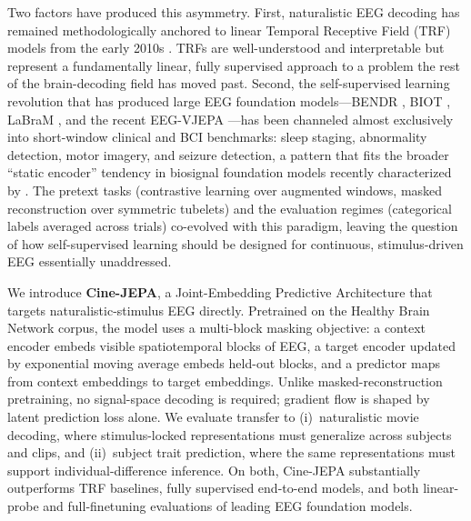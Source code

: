 Two factors have produced this asymmetry. First, naturalistic EEG decoding has
remained methodologically anchored to linear Temporal Receptive Field (TRF)
models from the early 2010s \citep{lalor2010, crosse2016, diliberto2018}. TRFs
are well-understood and interpretable but represent a fundamentally linear,
fully supervised approach to a problem the rest of the brain-decoding field has
moved past. Second, the self-supervised learning revolution that has produced
large EEG foundation models---BENDR \citep{kostas2021}, BIOT \citep{yang2023},
LaBraM \citep{jiang2024}, and the recent EEG-VJEPA \citep{hojjati2025}---has
been channeled almost exclusively into short-window clinical and BCI benchmarks:
sleep staging, abnormality detection, motor imagery, and seizure detection,
a pattern that fits the broader ``static encoder'' tendency in biosignal
foundation models recently characterized by \citet{wu2026}. The pretext tasks
(contrastive learning over augmented windows, masked reconstruction over
symmetric tubelets) and the evaluation regimes (categorical labels averaged
across trials) co-evolved with this paradigm, leaving the question of how
self-supervised learning should be designed for continuous, stimulus-driven
EEG essentially unaddressed.
 
We introduce \textbf{Cine-JEPA}, a Joint-Embedding Predictive Architecture
\citep{lecun2022, assran2023, bardes2024} that targets naturalistic-stimulus EEG
directly. Pretrained on the Healthy Brain Network corpus, the model uses a
multi-block masking objective: a context encoder embeds visible spatiotemporal
blocks of EEG, a target encoder updated by exponential moving average embeds
held-out blocks, and a predictor maps from context embeddings to target
embeddings. Unlike masked-reconstruction pretraining, no signal-space decoding
is required; gradient flow is shaped by latent prediction loss alone. We
evaluate transfer to (i)~naturalistic movie decoding, where stimulus-locked
representations must generalize across subjects and clips, and (ii)~subject
trait prediction, where the same representations must support
individual-difference inference. On both, Cine-JEPA substantially outperforms
TRF baselines, fully supervised end-to-end models, and both linear-probe and
full-finetuning evaluations of leading EEG foundation models.
 

